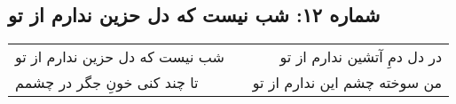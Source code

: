 \begin{center}
\section*{شماره ۱۲: شب نیست که دل حزین ندارم از تو}
\label{sec:012}
\begin{longtable}{l p{0.5cm} r}
شب نیست که دل حزین ندارم از تو
&&
در دل دمِ آتشین ندارم از تو
\\
تا چند کنی خونِ جگر در چشمم
&&
من سوخته چشم این ندارم از تو
\\
\end{longtable}
\end{center}
